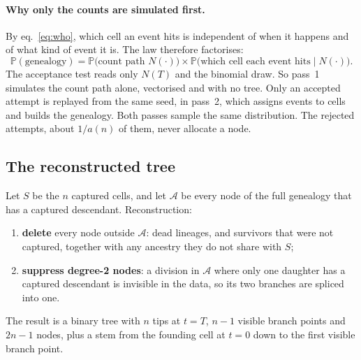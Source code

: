 \documentclass[11pt]{article}
\newcommand{\Prob}{\mathbb{P}}
\begin{document}
\paragraph{Why only the counts are simulated first.} By eq.~\eqref{eq:who}, which cell an event
hits is independent of when it happens and of what kind of event it is. The law therefore
factorises:
\begin{equation}
  \Prob(\text{genealogy}) = \Prob\big(\text{count path } N(\cdot)\big)\times
  \Prob\big(\text{which cell each event hits} \mid N(\cdot)\big).
  \label{eq:factor}
\end{equation}
The acceptance test reads only $N(T)$ and the binomial draw. So pass~1 simulates the count path
alone, vectorised and with no tree. Only an accepted attempt is replayed from the same seed, in
pass~2, which assigns events to cells and builds the genealogy. Both passes sample the same
distribution. The rejected attempts, about $1/a(n)$ of them, never allocate a node.

\subsection{The reconstructed tree}

Let $S$ be the $n$ captured cells, and let $\mathcal{A}$ be every node of the full genealogy that
has a captured descendant. Reconstruction:
\begin{enumerate}
  \item \textbf{delete} every node outside $\mathcal{A}$: dead lineages, and survivors that were
        not captured, together with any ancestry they do not share with $S$;
  \item \textbf{suppress degree-2 nodes}: a division in $\mathcal{A}$ where only one daughter has
        a captured descendant is invisible in the data, so its two branches are spliced into one.
\end{enumerate}
The result is a binary tree with $n$ tips at $t=T$, $n-1$ visible branch points and $2n-1$
nodes, plus a stem from the founding cell at $t=0$ down to the first visible branch point.
\end{document}
